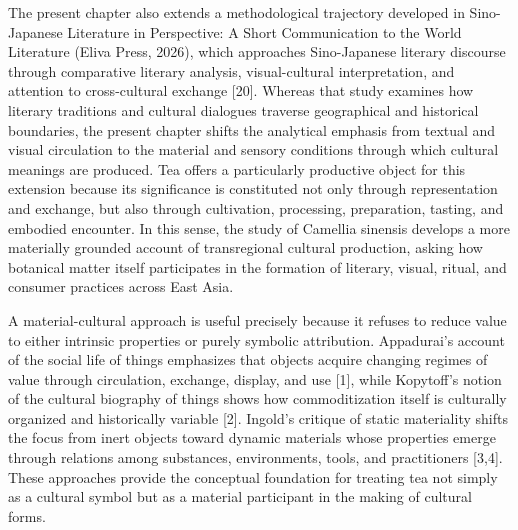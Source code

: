 \documentclass[11pt,a4paper]{article}
\begin{document}
The present chapter also extends a methodological trajectory developed in Sino-Japanese Literature in Perspective: A Short Communication to the World Literature (Eliva Press, 2026), which approaches Sino-Japanese literary discourse through comparative literary analysis, visual-cultural interpretation, and attention to cross-cultural exchange [20]. Whereas that study examines how literary traditions and cultural dialogues traverse geographical and historical boundaries, the present chapter shifts the analytical emphasis from textual and visual circulation to the material and sensory conditions through which cultural meanings are produced. Tea offers a particularly productive object for this extension because its significance is constituted not only through representation and exchange, but also through cultivation, processing, preparation, tasting, and embodied encounter. In this sense, the study of Camellia sinensis develops a more materially grounded account of transregional cultural production, asking how botanical matter itself participates in the formation of literary, visual, ritual, and consumer practices across East Asia.

A material-cultural approach is useful precisely because it refuses to reduce value to either intrinsic properties or purely symbolic attribution. Appadurai's account of the social life of things emphasizes that objects acquire changing regimes of value through circulation, exchange, display, and use [1], while Kopytoff's notion of the cultural biography of things shows how commoditization itself is culturally organized and historically variable [2]. Ingold's critique of static materiality shifts the focus from inert objects toward dynamic materials whose properties emerge through relations among substances, environments, tools, and practitioners [3,4]. These approaches provide the conceptual foundation for treating tea not simply as a cultural symbol but as a material participant in the making of cultural forms.
\end{document}
